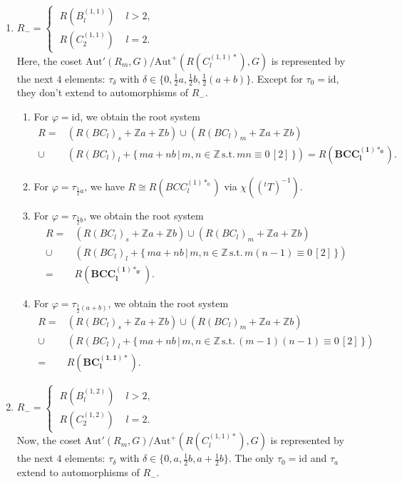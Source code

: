 \documentclass[11pt]{amsart}
\newcommand{\Z}{\mathbb{Z}}
\newcommand{\Aut}{\mathrm{Aut}}
\newcommand{\id}{\mathrm{id}}
\begin{document}
\begin{enumerate}
\item[(I)] $R_-=\begin{cases}\; R(B_l^{(1,1)})\; &l>2, \\ \; R(C_2^{(1,1)})\; &l=2.\end{cases}$ \\ Here, the coset $\Aut'(R_m,G)/\Aut^+(R(C_l^{(1,1)\ast}),G)$ is represented by the next $4$ elements: $\tau_\delta$ with $\delta \in \{0, \frac{1}{2}a, \frac{1}{2}b, \frac{1}{2}(a+b)\}$. Except for $\tau_0=\id$, they don't extend to automorphisms of $R_-$.
\begin{enumerate}
\item[(i)] For $\varphi=\id$, we obtain the root system
\begin{align*}
R=
&(R(BC_l)_s+\Z a+\Z b) \cup (R(BC_l)_m+\Z a+\Z b) \\
\cup
&(R(BC_l)_l+ \{\, ma+nb\, \vert\, m,n \in \Z\, \text{s.t.}\, mn \equiv 0\, [2]\, \}) 
= 
R(\mathbf{BCC_l^{(1)\ast_0}}).
\end{align*}
\item[(ii)] For $\varphi=\tau_{\frac{1}{2}a}$, we have  $R\cong R(BCC_l^{(1)\ast_0})$ via $\chi(({}^tT)^{-1})$.
\item[(iii)] For $\varphi=\tau_{\frac{1}{2}b}$, we obtain the root system
\begin{align*}
R=
&(R(BC_l)_s+\Z a+\Z b) \cup (R(BC_l)_m+\Z a+\Z b) \\
\cup
&(R(BC_l)_l+ \{\, ma+nb\, \vert\, m,n \in \Z\, \text{s.t.}\, m(n-1) \equiv 0\, [2]\, \}) \\
=
&R(\mathbf{BCC_l^{(1)\ast_{0'}}}).
\end{align*}
\item[(iv)] For $\varphi=\tau_{\frac{1}{2}(a+b)}$, we obtain the root system
\begin{align*}
R=
&(R(BC_l)_s+\Z a+\Z b) \cup (R(BC_l)_m+\Z a+\Z b) \\
\cup
&(R(BC_l)_l+ \{\, ma+nb\, \vert\, m,n \in \Z\, \text{s.t.}\, (m-1)(n-1) \equiv 0\, [2]\, \}) \\
=
&R(\mathbf{BC_l^{(1,1)\ast}}).
\end{align*}
\end{enumerate}
\item[(II)] $R_-=\begin{cases}\; R(B_l^{(1,2)})\; &l>2, \\ \; R(C_2^{(1,2)})\; &l=2.\end{cases}$ \\ Now, the coset $\Aut'(R_m,G)/\Aut^+(R(C_l^{(1,1)\ast}),G)$ is represented by the next $4$ elements: $\tau_\delta$ with $\delta \in \{0, a, \frac{1}{2}b, a+\frac{1}{2}b\}$. The only $\tau_0=\id$ and $\tau_a$ extend to automorphisms of $R_-$. 

\end{enumerate}
\end{document}
